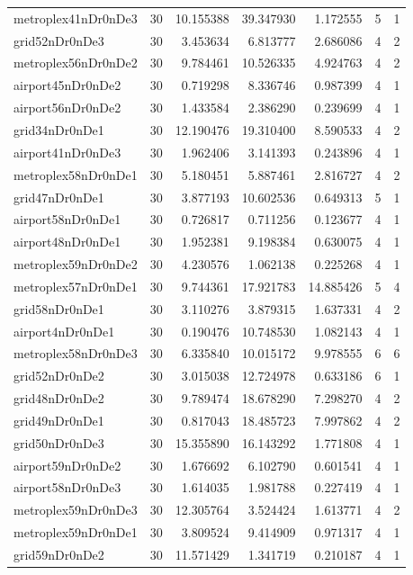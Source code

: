 \documentclass[../../../thesis.tex]{subfiles}
\begin{document}
\begin{longtable}{|l|r|r|r|r|r|r|}
metroplex41nDr0nDe3 & 30 & 10.155388 & 39.347930 & 1.172555 & 5 & 1 \\
grid52nDr0nDe3 & 30 & 3.453634 & 6.813777 & 2.686086 & 4 & 2 \\
metroplex56nDr0nDe2 & 30 & 9.784461 & 10.526335 & 4.924763 & 4 & 2 \\
airport45nDr0nDe2 & 30 & 0.719298 & 8.336746 & 0.987399 & 4 & 1 \\
airport56nDr0nDe2 & 30 & 1.433584 & 2.386290 & 0.239699 & 4 & 1 \\
grid34nDr0nDe1 & 30 & 12.190476 & 19.310400 & 8.590533 & 4 & 2 \\
airport41nDr0nDe3 & 30 & 1.962406 & 3.141393 & 0.243896 & 4 & 1 \\
metroplex58nDr0nDe1 & 30 & 5.180451 & 5.887461 & 2.816727 & 4 & 2 \\
grid47nDr0nDe1 & 30 & 3.877193 & 10.602536 & 0.649313 & 5 & 1 \\
airport58nDr0nDe1 & 30 & 0.726817 & 0.711256 & 0.123677 & 4 & 1 \\
airport48nDr0nDe1 & 30 & 1.952381 & 9.198384 & 0.630075 & 4 & 1 \\
metroplex59nDr0nDe2 & 30 & 4.230576 & 1.062138 & 0.225268 & 4 & 1 \\
metroplex57nDr0nDe1 & 30 & 9.744361 & 17.921783 & 14.885426 & 5 & 4 \\
grid58nDr0nDe1 & 30 & 3.110276 & 3.879315 & 1.637331 & 4 & 2 \\
airport4nDr0nDe1 & 30 & 0.190476 & 10.748530 & 1.082143 & 4 & 1 \\
metroplex58nDr0nDe3 & 30 & 6.335840 & 10.015172 & 9.978555 & 6 & 6 \\
grid52nDr0nDe2 & 30 & 3.015038 & 12.724978 & 0.633186 & 6 & 1 \\
grid48nDr0nDe2 & 30 & 9.789474 & 18.678290 & 7.298270 & 4 & 2 \\
grid49nDr0nDe1 & 30 & 0.817043 & 18.485723 & 7.997862 & 4 & 2 \\
grid50nDr0nDe3 & 30 & 15.355890 & 16.143292 & 1.771808 & 4 & 1 \\
airport59nDr0nDe2 & 30 & 1.676692 & 6.102790 & 0.601541 & 4 & 1 \\
airport58nDr0nDe3 & 30 & 1.614035 & 1.981788 & 0.227419 & 4 & 1 \\
metroplex59nDr0nDe3 & 30 & 12.305764 & 3.524424 & 1.613771 & 4 & 2 \\
metroplex59nDr0nDe1 & 30 & 3.809524 & 9.414909 & 0.971317 & 4 & 1 \\
grid59nDr0nDe2 & 30 & 11.571429 & 1.341719 & 0.210187 & 4 & 1 \\

\end{longtable}
\end{document}
